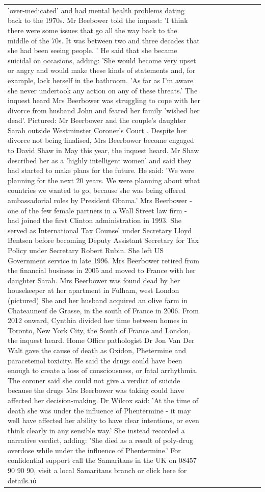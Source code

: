 \begin{table}[H]
\begin{tabular}{lllrlllll}
'over-medicated' and had mental health problems dating back to the 1970s. Mr Beebower told the inquest: 'I think there were some issues that go all the way back to the middle of the 70s. It was between two and three decades that she had been seeing people. ' He said that she became suicidal on occasions, adding: 'She would become very upset or angry and would make these kinds of statements and, for example, lock herself in the bathroom. 'As far as I'm aware she never undertook any action on any of these threats.' The inquest heard Mrs Beerbower was struggling to cope with her divorce from husband John and feared her family 'wished her dead'. Pictured: Mr Beerbower and the couple's daughter Sarah outside Westminster Coroner's Court . Despite her divorce not being finalised, Mrs Beerbower become engaged to David Shaw in May this year, the inquest heard. Mr Shaw described her as a 'highly intelligent women' and said they had started to make plans for the future. He said: 'We were planning for the next 20 years. We were planning about what countries we wanted to go, because she was being offered ambassadorial roles by President Obama.' Mrs Beerbower - one of the few female partners in a Wall Street law firm - had joined the first Clinton administration in 1993. She served as International Tax Counsel under Secretary Lloyd Bentsen before becoming Deputy Assistant Secretary for Tax Policy under Secretary Robert Rubin. She left US Government service in late 1996. Mrs Beerbower retired from the financial business in 2005 and moved to France with her daughter Sarah. Mrs Beerbower was found dead by her housekeeper at her apartment in Fulham, west London (pictured) She and her husband acquired an olive farm in Chateauneuf de Grasse, in the south of France in 2006. From 2012 onward, Cynthia divided her time between homes in Toronto, New York City, the South of France and London, the inquest heard. Home Office pathologist Dr Jon Van Der Walt gave the cause of death as Oxidon, Phetermine and paracetemol toxicity. He said the drugs could have been enough to create a loss of consciousness, or fatal arrhythmia. The coroner said she could not give a verdict of suicide because the drugs Mrs Beerbower was taking could have affected her decision-making. Dr Wilcox said: 'At the time of death she was under the influence of Phentermine - it may well have affected her ability to have clear intentions, or even think clearly in any sensible way.' She instead recorded a narrative verdict, adding: 'She died as a result of poly-drug overdose while under the influence of Phentermine.' For confidential support call the Samaritans in the UK on 08457 90 90 90, visit a local Samaritans branch or click here for details.τό \\

\end{tabular}
\end{table}
